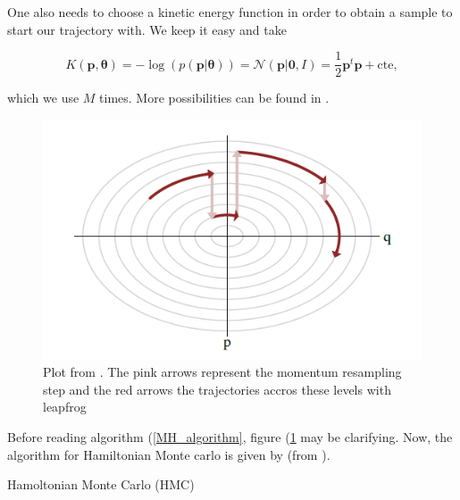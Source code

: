 \documentclass[12pt,a4paper,oneside]{book}
\makeatletter
\def\BState{\State\hskip-\ALG@thistlm}
\makeatother
\begin{document}
One also needs to choose a kinetic energy function in order to obtain a sample to start our trajectory with. We keep it easy and take 

\begin{equation}
K(\bm{p}, \bm{\theta}) = -\log(p( \bm{p} |\bm{\theta})) = \mathcal{N}(\bm{p}|\bm{0},I) = \dfrac{1}{2}\bm{p}^t \bm{p} + \text{cte}, 
\end{equation}

which we use $M$ times. More possibilities can be found in \cite{betancourt2017conceptual}.  

\begin{figure}[!htb]
     \centering
     \includegraphics[width=0.4\linewidth]{plot_levelset}
     \caption{Plot from \cite{betancourt2017conceptual}. The pink arrows represent the momentum resampling step and the red arrows the trajectories accros these levels with leapfrog}\label{fig:level_set1.1}
\end{figure}

Before reading algorithm (\ref{MH_algorithm}, figure (\ref{fig:level_set1.1} may be clarifying. Now, the algorithm for Hamiltonian Monte carlo is given by (from \cite{hoffman2014no}). 

\begin{algorithm}
\caption{Hamoltonian Monte Carlo (HMC)}\label{MH_algorithm}
\end{algorithm}
\end{document}
